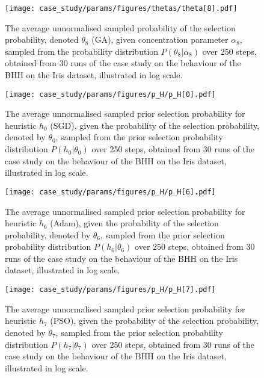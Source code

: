 \begin{figure}[htpb]
	\centering
	\texttt{[image: case\_study/params/figures/thetas/theta[8].pdf]}
	\caption{The average unnormalised sampled probability of the selection probability, denoted $\theta_{8}$ (\acs{GA}), given concentration parameter $\alpha_{8}$, sampled from the probability distribution $P(\theta_{8} \vert \alpha_{8})$ over 250 steps, obtained from 30 runs of the case study on the behaviour of the \acs{BHH} on the Iris dataset, illustrated in log scale.}
	\label{fig:results:case_study:theta:8}
\end{figure}


\begin{figure}[htpb]
	\centering
	\texttt{[image: case\_study/params/figures/p\_H/p\_H[0].pdf]}
	\caption{The average unnormalised sampled prior selection probability for heuristic $h_{0}$ (\acs{SGD}), given the probability of the selection probability, denoted by $\theta_{0}$, sampled from the prior selection probability distribution $P(h_{0} \vert \theta_{0})$ over 250 steps, obtained from 30 runs of the case study on the behaviour of the \acs{BHH} on the Iris dataset, illustrated in log scale.}
	\label{fig:results:case_study:p_H:0}
\end{figure}

\begin{figure}[htpb]
	\centering
	\texttt{[image: case\_study/params/figures/p\_H/p\_H[6].pdf]}
	\caption{The average unnormalised sampled prior selection probability for heuristic $h_{6}$ (\acs{Adam}), given the probability of the selection probability, denoted by $\theta_{6}$, sampled from the prior selection probability distribution $P(h_{6} \vert \theta_{6})$ over 250 steps, obtained from 30 runs of the case study on the behaviour of the \acs{BHH} on the Iris dataset, illustrated in log scale.}
	\label{fig:results:case_study:p_H:6}
\end{figure}

\begin{figure}[htpb]
	\centering
	\texttt{[image: case\_study/params/figures/p\_H/p\_H[7].pdf]}
	\caption{The average unnormalised sampled prior selection probability for heuristic $h_{7}$ (\acs{PSO}), given the probability of the selection probability, denoted by $\theta_{7}$, sampled from the prior selection probability distribution $P(h_{7} \vert \theta_{7})$ over 250 steps, obtained from 30 runs of the case study on the behaviour of the \acs{BHH} on the Iris dataset, illustrated in log scale.}
	\label{fig:results:case_study:p_H:7}
\end{figure}

